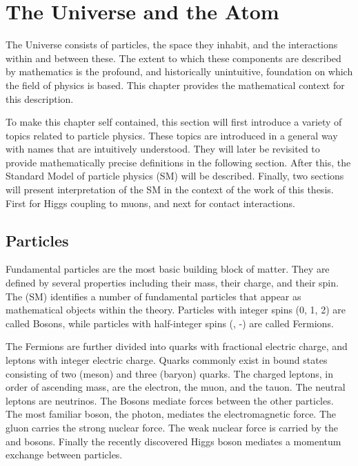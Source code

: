 \section{The Universe and the Atom}

The Universe consists of particles, the space they inhabit, and the interactions within and between these.
The extent to which these components are described by mathematics is the profound, and historically unintuitive, foundation on which the field of physics is based.
This chapter provides the mathematical context for this description.

To make this chapter self contained, this section will first introduce a variety of topics related to particle physics.
These topics are introduced in a general way with names that are intuitively understood.
They will later be revisited to provide mathematically precise definitions in the following section.
After this, the Standard Model of particle physics (SM) will be described.
Finally, two sections will present interpretation of the SM in the context of the work of this thesis. First for Higgs coupling to muons, and next for contact interactions.

\subsection{Particles}
Fundamental particles are the most basic building block of matter.
They are defined by several properties including their mass, their charge, and their spin.
The (SM) identifies a number of fundamental particles that appear as mathematical objects within the theory.
Particles with integer spins (0, 1, 2) are called Bosons, while particles with half-integer spins (\half, -\half) are called Fermions.

The Fermions are further divided into quarks with fractional electric charge, and leptons with integer electric charge.
Quarks commonly exist in bound states consisting of two (meson) and three (baryon) quarks.
The charged leptons, in order of ascending mass, are the electron, the muon, and the tauon.
The neutral leptons are neutrinos.
The Bosons mediate forces between the other particles.
The most familiar boson, the photon, mediates the electromagnetic force.
The gluon carries the strong nuclear force.
The weak nuclear force is carried by the \W and \Z bosons.
Finally the recently discovered Higgs boson mediates a momentum exchange between particles.

